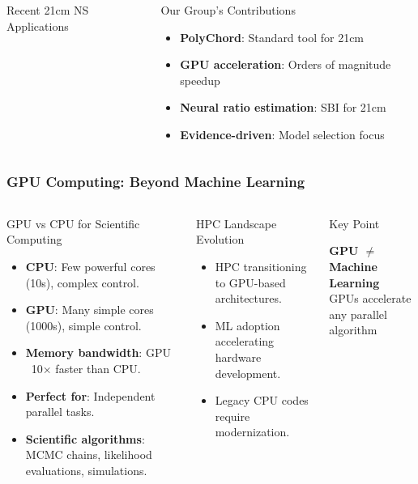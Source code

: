 \documentclass[aspectratio=169]{beamer}
\begin{document}
\begin{frame}
\begin{columns}
\begin{block}{Recent 21cm NS Applications}
\begin{itemize}
            \end{itemize}
        \end{block}
        \begin{block}{Our Group's Contributions}
            \begin{itemize}
                \item \textbf{PolyChord}: Standard tool for 21cm
                \item \textbf{GPU acceleration}: Orders of magnitude speedup
                \item \textbf{Neural ratio estimation}: SBI for 21cm
                \item \textbf{Evidence-driven}: Model selection focus
            \end{itemize}
        \end{block}
    \end{columns}
\end{frame}

\begin{frame}
    \frametitle{GPU Computing: Beyond Machine Learning}
    \begin{columns}
        \begin{block}{GPU vs CPU for Scientific Computing}
            \begin{itemize}
                \item \textbf{CPU}: Few powerful cores (10s), complex control.
                \item \textbf{GPU}: Many simple cores (1000s), simple control.
                \item \textbf{Memory bandwidth}: GPU ~10× faster than CPU.
                \item \textbf{Perfect for}: Independent parallel tasks.
                \item \textbf{Scientific algorithms}: MCMC chains, likelihood evaluations, simulations.
            \end{itemize}
        \end{block}
        \begin{block}{HPC Landscape Evolution}
            \begin{itemize}
                \item HPC transitioning to GPU-based architectures.
                \item ML adoption accelerating hardware development.
                \item Legacy CPU codes require modernization.
            \end{itemize}
        \end{block}
        \begin{block}{Key Point}
            \begin{center}
                \textbf{GPU $\neq$ Machine Learning}\\
                GPUs accelerate any parallel algorithm
            \end{center}
        \end{block}
    \end{columns}
\end{frame}
\end{document}
